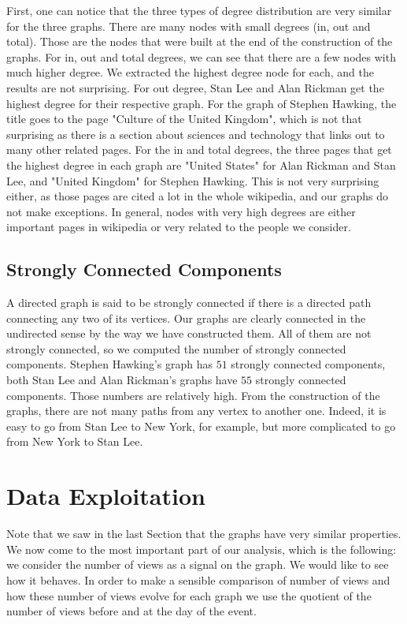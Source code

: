 \documentclass[conference]{IEEEtran}
\begin{document}
First, one can notice that the three types of degree distribution are very similar for the three graphs. There are many nodes with small degrees (in, out and total). Those are the nodes that were built at the end of the construction of the graphs. For in, out and total degrees, we can see that there are a few nodes with much higher degree. We extracted the highest degree node for each, and the results are not surprising. For out degree, Stan Lee and Alan Rickman get the highest degree for their respective graph. For the graph of Stephen Hawking, the title goes to the page "Culture of the United Kingdom", which is not that surprising as there is a section about sciences and technology that links out to many other related pages. For the in and total degrees, the three pages that get the highest degree in each graph are "United States" for Alan Rickman and Stan Lee, and "United Kingdom" for Stephen Hawking. This is not very surprising either, as those pages are cited a lot in the whole wikipedia, and our graphs do not make exceptions. In general, nodes with very high degrees are either important pages in wikipedia or very related to the people we consider. 

\subsection{Strongly Connected Components}

A directed graph is said to be strongly connected if there is a directed path connecting any two of its vertices. Our graphs are clearly connected in the undirected sense by the way we have constructed them. All of them are not strongly connected, so we computed the number of strongly connected components. Stephen Hawking's graph has $51$ strongly connected components, both Stan Lee and Alan Rickman's graphs have $55$ strongly connected components. Those numbers are relatively high. From the construction of the graphs, there are not many paths from any vertex to another one. Indeed, it is easy to go from Stan Lee to New York, for example, but more complicated to go from New York to Stan Lee. 

\section{Data Exploitation} \label{exploitation}
Note that we saw in the last Section that the graphs have very similar properties. 
We now come to the most important part of our analysis, which is the following: we consider the number of views as a signal on the graph. We would like to see how it behaves. In order to make a sensible comparison of number of views and how these number of views evolve for each graph we use the quotient of the number of views before and at the day of the event. 
\end{document}
